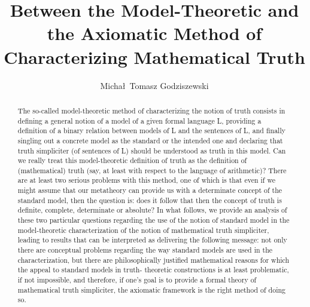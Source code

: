 \documentclass[runningheads]{llncs}
\begin{document}
% 

\title{Between the Model-Theoretic and the Axiomatic Method of Characterizing Mathematical Truth}

\author{Micha\l\, Tomasz Godziszewski }



\maketitle

\begin{abstract}
The so-called model-theoretic method of characterizing the notion of truth consists in defining a general
notion of a model of a given formal language L, providing a definition of a binary relation between models
of L and the sentences of L, and finally singling out a concrete model as the standard or the intended one
and declaring that truth simpliciter (of sentences of L) should be understood as truth in this model. Can
we really treat this model-theoretic definition of truth as the definition of (mathematical) truth (say, at
least with respect to the language of arithmetic)?
There are at least two serious problems with this method, one of which is that even if we might assume that our metatheory
can provide us with a determinate concept of the standard model, then the question is: does it
follow that then the concept of truth is definite, complete, determinate or absolute?
In what follows, we provide an analysis of these two particular questions regarding the use of the
notion of standard model in the model-theoretic characterization of the notion of mathematical truth
simpliciter, leading to results that can be interpreted as delivering the following message: not only there
are conceptual problems regarding the way standard models are used in the characterization, but there 
are philosophically justified mathematical reasons for which the appeal to standard models in truth-
theoretic constructions is at least problematic, if not impossible, and therefore, if one's goal is to provide a formal theory of mathematical truth simpliciter, the axiomatic framework is the right method of doing so.

\end{abstract}
\end{document}
